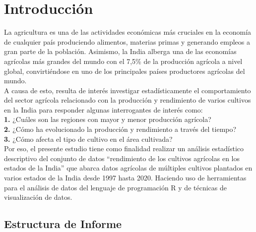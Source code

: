 \documentclass[oneside,11pt]{Latex/Classes/PhDthesisPSnPDF}
\begin{document}
\chapter*{Introducción}

La agricultura es una de las actividades económicas más cruciales en la
economía de cualquier país produciendo alimentos, materias primas y
generando empleos a gran parte de la población. Asimismo, la India
alberga una de las economías agrícolas más grandes del mundo con el
7,5\% de la producción agrícola a nivel global, convirtiéndose en uno de
los principales países productores agrícolas del mundo.\\

A causa de esto, resulta de interés investigar estadísticamente el
comportamiento del sector agrícola relacionado con la producción y
rendimiento de varios cultivos en la India para responder algunas
interrogantes de interés como:\\

\textbf{1.} ¿Cuáles son las regiones con mayor y menor producción
agrícola?\\

\textbf{2.} ¿Cómo ha evolucionado la producción y rendimiento a través
del tiempo?\\

\textbf{3.} ¿Cómo afecta el tipo de cultivo en el área cultivada?\\

Por eso, el presente estudio tiene como finalidad realizar un análisis
estadístico descriptivo del conjunto de datos ``rendimiento de los
cultivos agrícolas en los estados de la India'' que abarca datos
agrícolas de múltiples cultivos plantados en varios estados de la India
desde 1997 hasta 2020. Haciendo uso de herramientas para el análisis de
datos del lenguaje de programación R y de técnicas de visualización de
datos.\\

\section*{Estructura de Informe}
\end{document}
